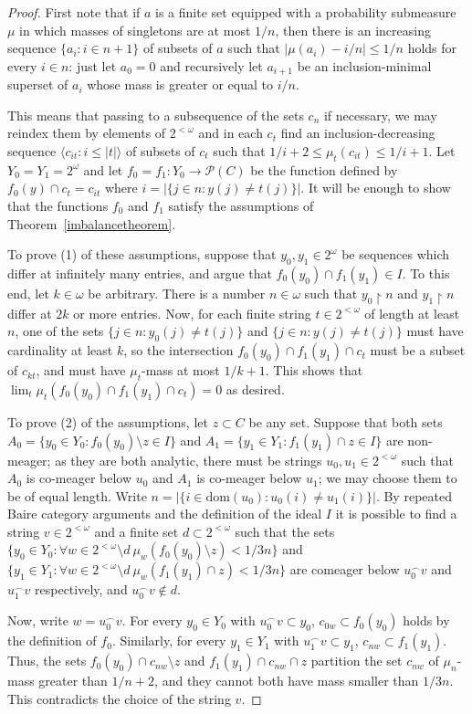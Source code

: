 \documentclass{article}
\newcommand{\gw}{\omega}
\newcommand{\cantor}{2^\gw}
\newcommand{\bintree}{2^{<\gw}}
\newcommand{\dom}{\mathrm{dom}}
\newcommand{\power}{\mathcal{P}}
\theoremstyle{definition}
\begin{document}
\begin{proof}
First note that if $a$ is a finite set equipped with a probability submeasure $\mu$ in which masses of singletons are at most $1/n$, then there is an increasing sequence $\{a_i\colon i\in n+1\}$ of subsets of $a$ such that $|\mu(a_i)-i/n|\leq 1/n$ holds for every $i\in n$: just let $a_0=0$ and recursively let $a_{i+1}$ be an inclusion-minimal superset of $a_i$ whose mass is greater or equal to $i/n$.

This means that passing to a subsequence of the sets $c_n$ if necessary, we may reindex them by elements of $\bintree$ and in each $c_t$ find an inclusion-decreasing sequence $\langle c_{it}\colon i\leq |t|\rangle$ of subsets of $c_t$ such that $1/{i+2}\leq\mu_t(c_{it})\leq 1/{i+1}$. Let $Y_0=Y_1=\cantor$ and let $f_0=f_1\colon Y_0\to \power(C)$ be the function defined by $f_0(y)\cap c_t=c_{it}$ where $i=|\{j\in n\colon y(j)\neq t(j)\}|$. It will be enough to show that the functions $f_0$ and $f_1$ satisfy the assumptions of Theorem~\ref{imbalancetheorem}.

To prove (1) of these assumptions, suppose that $y_0, y_1\in\cantor$ be sequences which differ at infinitely many entries, and argue that $f_0(y_0)\cap f_1(y_1)\in I$. To this end, let $k\in\gw$ be arbitrary. There is a number $n\in\gw$ such that $y_0\restriction n$ and $y_1\restriction n$ differ at $2k$ or more entries. Now, for each finite string $t\in\bintree$ of length at least $n$, one of the sets $\{j\in n\colon y_0(j)\neq t(j)\}$ and $\{j\in n\colon y(j)\neq t(j)\}$ must have cardinality at least $k$, so the intersection $f_0(y_0)\cap f_1(y_1)\cap c_t$ must be a subset of $c_{kt}$, and must have $\mu_t$-mass at most $1/k+1$. This shows that $\lim_t\mu_t(f_0(y_0)\cap f_1(y_1)\cap c_t)=0$ as desired.

To prove (2) of the assumptions, let $z\subset C$ be any set. Suppose that both sets $A_0=\{y_0\in Y_0\colon f_0(y_0)\setminus z\in I\}$ and $A_1=\{y_1\in Y_1\colon f_1(y_1)\cap z\in I\}$  are non-meager; as they are both analytic, there must be strings $u_0, u_1\in\bintree$ such that $A_0$ is co-meager below $u_0$ and $A_1$ is co-meager below $u_1$; we may choose them to be of equal length. Write $n=|\{i\in\dom(u_0)\colon u_0(i)\neq u_1(i)\}|$. By repeated Baire category arguments and the definition of the ideal $I$ it is possible to find a string $v\in\bintree$ and a finite set $d\subset\bintree$ such that the sets $\{y_0\in Y_0\colon\forall w\in\bintree\setminus d\ \mu_w(f_0(y_0)\setminus z)<1/3n\}$ and $\{y_1\in Y_1\colon\forall w\in\bintree\setminus d\ \mu_w(f_1(y_1)\cap z)<1/3n\}$ are comeager below $u_0^\smallfrown v$ and $u_1^\smallfrown v$ respectively, and $u_0^\smallfrown v\notin d$.

Now, write $w=u_0^\smallfrown v$. For every $y_0\in Y_0$ with $u_0^\smallfrown v\subset y_0$, $c_{0w}\subset f_0(y_0)$ holds by the definition of $f_0$. Similarly, for every $y_1\in Y_1$ with $u_1^\smallfrown v\subset y_1$, $c_{nw}\subset f_1(y_1)$. Thus, the sets $f_0(y_0)\cap c_{nw}\setminus z$ and $f_1(y_1)\cap c_{nw}\cap z$ partition the set $c_{nw}$ of $\mu_n$-mass greater than $1/n+2$, and they cannot both have mass smaller than $1/3n$. This contradicts the choice of the string $v$.
\end{proof}
\end{document}
